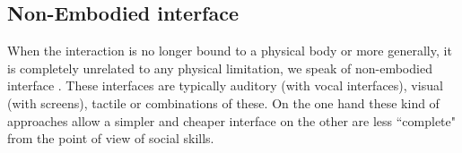 \documentclass{thesisreport}
\begin{document}
\subsection{Non-Embodied interface}
When the interaction is no longer bound to a physical body or more generally, it is completely unrelated to any physical limitation, we speak of non-embodied interface \cite{hoc2000human}. These interfaces are typically auditory (with vocal interfaces), visual (with screens), tactile or combinations of these. On the one hand these kind of approaches allow a simpler and cheaper interface on the other are less “complete" from the point of view of social skills.




\end{document}
